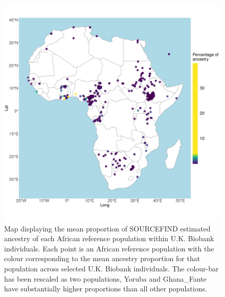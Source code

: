 \begin{figure}[htp]
    \centering
    \includegraphics[width=1.0\textwidth]{../images/chapter3/SF_props_map.pdf}
    \caption{Map displaying the mean proportion of SOURCEFIND estimated ancestry of each African reference population within U.K. Biobank individuals. Each point is an African reference population with the colour corresponding to the mean ancestry proportion for that population across selected U.K. Biobank individuals. The colour-bar has been rescaled as two populations, Yoruba and Ghana\_Fante have substantially higher proportions than all other populations.} 
    \label{fig:SF_props_map}
\end{figure}


